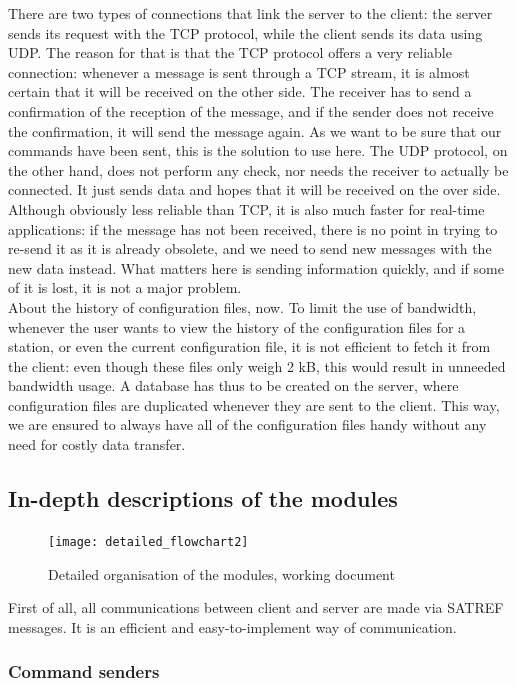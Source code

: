 \documentclass{themeensg}
\begin{document}
There are two types of connections that link the server to the client: the server sends its request with the TCP protocol, while the client sends its data using UDP. The reason for that is that the TCP protocol offers a very reliable connection: whenever a message is sent through a TCP stream, it is almost certain that it will be received on the other side. The receiver has to send a confirmation of the reception of the message, and if the sender does not receive the confirmation, it will send the message again. As we want to be sure that our commands have been sent, this is the solution to use here.
The UDP protocol, on the other hand, does not perform any check, nor needs the receiver to actually be connected. It just sends data and hopes that it will be received on the over side. Although obviously less reliable than TCP, it is also much faster for real-time applications: if the message has not been received, there is no point in trying to re-send it as it is already obsolete, and we need to send new messages with the new data instead. What matters here is sending information quickly, and if some of it is lost, it is not a major problem.\\

About the history of configuration files, now. To limit the use of bandwidth, whenever the user wants to view the history of the configuration files for a station, or even the current configuration file, it is not efficient to fetch it from the client: even though these files only weigh 2 kB, this would result in unneeded bandwidth usage.
A database has thus to be created on the server, where configuration files are duplicated whenever they are sent to the client. This way, we are ensured to always have all of the configuration files handy without any need for costly data transfer.


\subsection{In-depth descriptions of the modules}

\begin{figure}[!h]
	\centering
	\texttt{[image: detailed\_flowchart2]}
	\caption{Detailed organisation of the modules, working document}
\end{figure}

First of all, all communications between client and server are made via SATREF messages. It is an efficient and easy-to-implement way of communication.

\subsubsection{Command senders}
\end{document}
